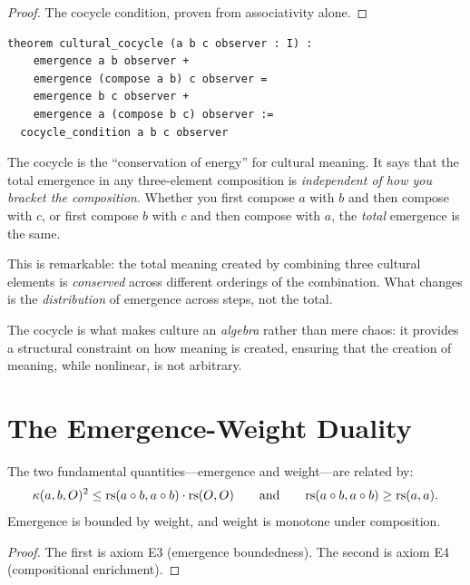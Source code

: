 \begin{proof}
The cocycle condition, proven from associativity alone.
\end{proof}

\begin{lstlisting}
theorem cultural_cocycle (a b c observer : I) :
    emergence a b observer +
    emergence (compose a b) c observer =
    emergence b c observer +
    emergence a (compose b c) observer :=
  cocycle_condition a b c observer
\end{lstlisting}

\begin{interpretation}
The cocycle is the ``conservation of energy'' for cultural meaning.
It says that the total emergence in any three-element composition is
\emph{independent of how you bracket the composition}.  Whether you
first compose $a$ with $b$ and then compose with $c$, or first compose
$b$ with $c$ and then compose with $a$, the \emph{total} emergence is
the same.

This is remarkable: the total meaning created by combining three
cultural elements is \emph{conserved} across different orderings of the
combination.  What changes is the \emph{distribution} of emergence
across steps, not the total.

The cocycle is what makes culture an \emph{algebra} rather than mere
chaos: it provides a structural constraint on how meaning is created,
ensuring that the creation of meaning, while nonlinear, is not arbitrary.
\end{interpretation}

\section{The Emergence-Weight Duality}

\begin{theorem}
\label{thm:duality}
The two fundamental quantities---emergence and weight---are
related by:
\[
  \kappa(a, b, O)^2 \leq \mathrm{rs}(a \circ b, a \circ b) \cdot \mathrm{rs}(O, O)
  \qquad \text{and} \qquad
  \mathrm{rs}(a \circ b, a \circ b) \geq \mathrm{rs}(a, a).
\]
Emergence is bounded by weight, and weight is monotone under composition.
\end{theorem}

\begin{proof}
The first is axiom E3 (emergence boundedness).
The second is axiom E4 (compositional enrichment).
\end{proof}

